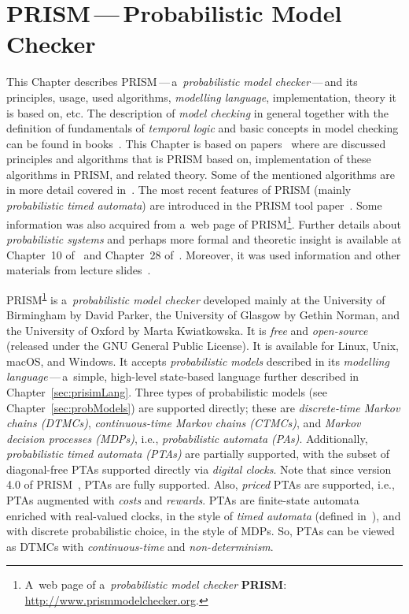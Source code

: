 \documentclass[a4paper, 11pt]{article}
\theoremstyle{definition}
\begin{document}
\section{\texorpdfstring{PRISM\,---\,Probabilistic Model Checker}{%
    PRISM - Probabilistic Model Checker%
}}
\label{sec:prism}

This Chapter describes PRISM\,---\,a~\emph{probabilistic model
checker}\,---\,and its principles, usage, used algorithms, \emph{modelling
language}, implementation, theory it is based on, etc. The description
of \emph{model checking} in general together with the definition of
fundamentals of \emph{temporal logic} and basic concepts in model checking
can be found in books~\cite{principlesOfModelCheck, handbookOfModelCheck}.
This Chapter is based on papers~\cite{stochModelCheck,
advancesOfProbabModelCheck} where are discussed principles and algorithms
that is PRISM based on, implementation of these algorithms in PRISM, and
related theory. Some of the mentioned algorithms are in more detail covered
in~\cite{automatedVerForProbSys}. The most recent features of PRISM
(mainly \emph{probabilistic timed automata}) are introduced in the PRISM
tool paper~\cite{prism40}. Some information was also acquired from
a~web page of PRISM\footnote{\label{fn:prism}A~web page of
a~\emph{probabilistic model checker} \textbf{PRISM}:
\url{http://www.prismmodelchecker.org}.}. Further details about
\emph{probabilistic systems} and perhaps more formal and theoretic insight
is available at Chapter~10 of~\cite{principlesOfModelCheck} and
Chapter~28 of~\cite{handbookOfModelCheck}. Moreover, it was used information
and other materials from lecture slides~\cite{bissLec, esslliLec,
probModelCheckLec, mbaCeska}.

PRISM\textsuperscript{\ref{fn:prism}} is a~\emph{probabilistic model checker}
developed mainly at the University of Birmingham by David Parker, the
University of Glasgow by Gethin Norman, and the University of Oxford by
Marta Kwiatkowska. It is \emph{free} and \emph{open-source} (released under
the GNU General Public License). It is available for Linux, Unix, macOS, and
Windows. It accepts \emph{probabilistic models} described in its
\emph{modelling language}\,---\,a~simple, high-level state-based language
further described in Chapter~\ref{sec:prisimLang}. Three types of
probabilistic models (see Chapter~\ref{sec:probModels}) are supported
directly; these are \emph{discrete-time Markov chains (DTMCs)},
\emph{continuous-time Markov chains (CTMCs)}, and \emph{Markov decision
processes (MDPs)}, i.e., \emph{probabilistic automata (PAs)}. Additionally,
\emph{probabilistic timed automata (PTAs)} are partially supported, with the
subset of diagonal-free PTAs supported directly via \emph{digital clocks}.
Note that since version 4.0 of PRISM~\cite{prism40}, PTAs are fully
supported. Also, \emph{priced} PTAs are supported, i.e., PTAs augmented
with \emph{costs} and \emph{rewards}. PTAs are finite-state automata
enriched with real-valued clocks, in the style of \emph{timed automata}
(defined in~\cite{principlesOfModelCheck}), and with discrete probabilistic
choice, in the style of MDPs. So, PTAs can be viewed as DTMCs with
\emph{continuous-time} and \emph{non-determinism}.
\end{document}
